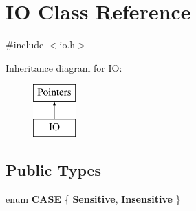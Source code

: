 \hypertarget{classIO}{}\section{IO Class Reference}
\label{classIO}


{\ttfamily \#include $<$io.\+h$>$}

Inheritance diagram for IO\+:\begin{figure}[H]
\begin{center}
\leavevmode
\includegraphics[height=2.000000cm]{classIO}
\end{center}
\end{figure}
\subsection*{Public Types}
\begin{DoxyCompactItemize}
\item 
\mbox{\label{classIO_a527094b0734eedb3b151d65d5af39087}} 
enum {\bfseries C\+A\+SE} \{ {\bfseries Sensitive}, 
{\bfseries Insensitive}
 \}
\end{DoxyCompactItemize}
